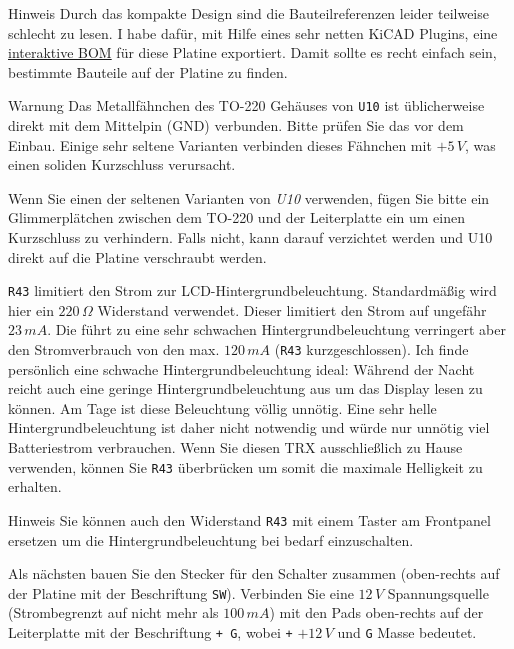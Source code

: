 \documentclass[10pt, a4paper,twoside]{scrartcl}
\newenvironment{remark}{\begin{bclogo}[couleur=blue!30,arrondi=.1,logo=\bcinfo,ombre=true]{Hinweis}}{\end{bclogo}}
\newenvironment{warning}{\begin{bclogo}[couleur=red!30,arrondi=.1,logo=\bcattention,ombre=true]{Warnung}}{\end{bclogo}}
\begin{document}
\begin{remark}
 Durch das kompakte Design sind die Bauteilreferenzen leider teilweise schlecht zu lesen. I habe dafür, mit Hilfe eines sehr netten KiCAD Plugins, eine \href{https://dm3mat.darc.de/cw2019/rx_rev2_ibom.html}{interaktive BOM} für diese Platine exportiert. Damit sollte es recht einfach sein, bestimmte Bauteile auf der Platine zu finden.
\end{remark}

\begin{warning}
Das Metallfähnchen des TO-220 Gehäuses von \texttt{U10} ist üblicherweise direkt mit dem Mittelpin (GND) verbunden. Bitte prüfen Sie das vor dem Einbau. Einige sehr seltene Varianten verbinden dieses Fähnchen mit $+5\,V$, was einen soliden Kurzschluss verursacht.
\end{warning}

Wenn Sie einen der seltenen Varianten von \emph{U10} verwenden, fügen Sie bitte ein Glimmerplätchen zwischen dem TO-220 und der Leiterplatte ein um einen Kurzschluss zu verhindern. Falls nicht, kann darauf verzichtet werden und U10 direkt auf die Platine verschraubt werden.

 \texttt{R43} limitiert den Strom zur LCD-Hintergrundbeleuchtung. Standardmäßig wird hier ein $220\,\Omega$ Widerstand verwendet. Dieser limitiert den Strom auf ungefähr $23\,mA$. Die führt zu eine sehr schwachen Hintergrundbeleuchtung verringert aber den Stromverbrauch von den max. $120\,mA$ (\texttt{R43} kurzgeschlossen). Ich finde persönlich eine schwache Hintergrundbeleuchtung ideal: Während der Nacht reicht auch eine geringe Hintergrundbeleuchtung aus um das Display lesen zu können. Am Tage ist diese Beleuchtung völlig unnötig. Eine sehr helle Hintergrundbeleuchtung ist daher nicht notwendig und würde nur unnötig viel Batteriestrom verbrauchen. Wenn Sie diesen TRX ausschließlich zu Hause verwenden, können Sie \texttt{R43} überbrücken um somit die maximale Helligkeit zu erhalten.
 
\begin{remark} 
 Sie können auch den Widerstand \texttt{R43} mit einem Taster am Frontpanel ersetzen um die Hintergrundbeleuchtung bei bedarf einzuschalten.
\end{remark}

 Als nächsten bauen Sie den Stecker für den Schalter zusammen (oben-rechts auf der Platine mit der Beschriftung \texttt{SW}). Verbinden Sie eine $12\,V$ Spannungsquelle (Strombegrenzt auf nicht mehr als $100\,mA$) mit den Pads oben-rechts auf der Leiterplatte mit der Beschriftung \texttt{+ G}, wobei \texttt{+} $+12\,V$ und \texttt{G} Masse bedeutet.
\end{document}

